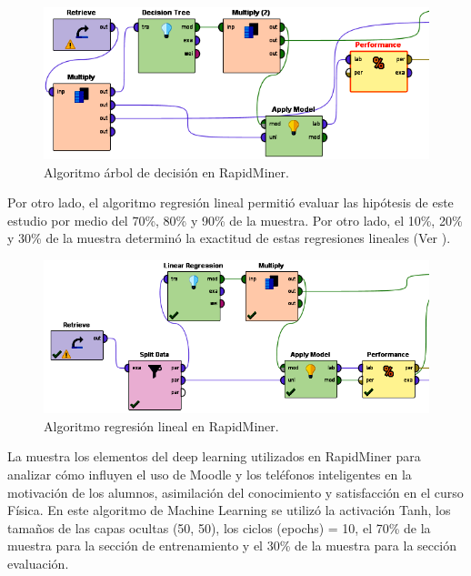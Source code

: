 \documentclass[spanish]{textolivre}
\begin{document}
\begin{figure}[htbp]
\centering
\begin{minipage}{.85\textwidth}
 \includegraphics[width=\textwidth]{Image2.png}
 \caption{Algoritmo árbol de decisión en RapidMiner.}
 \label{fig02}
\end{minipage}
\end{figure}

Por otro lado, el algoritmo regresión lineal permitió evaluar las hipótesis de este estudio por medio del 70\%, 80\% y 90\% de la muestra. Por otro lado, el 10\%, 20\% y 30\% de la muestra determinó la exactitud de estas regresiones lineales (Ver ).

\begin{figure}[htbp]
\centering
\begin{minipage}{.85\textwidth}
 \includegraphics[width=\textwidth]{Image3.png}
 \caption{Algoritmo regresión lineal en RapidMiner.}
 \label{fig03}
\end{minipage}
\end{figure}

La  muestra los elementos del deep learning utilizados en RapidMiner para analizar cómo influyen el uso de Moodle y los teléfonos inteligentes en la motivación de los alumnos, asimilación del conocimiento y satisfacción en el curso Física. En este algoritmo de Machine Learning se utilizó la activación Tanh, los tamaños de las capas ocultas (50, 50), los ciclos (epochs) = 10, el 70\% de la muestra para la sección de entrenamiento y el 30\% de la muestra para la sección evaluación.
\end{document}
